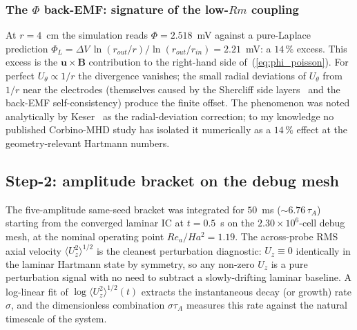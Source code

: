\documentclass[aps,prl,twocolumn,superscriptaddress]{revtex4-2}
\begin{document}
\subsubsection*{The $\Phi$ back-EMF: signature of the low-$Rm$ coupling}
At $r = 4$~cm the simulation reads $\Phi = 2.518$~mV against a
pure-Laplace prediction $\Phi_L =
\Delta V\,\ln(r_{out}/r)/\ln(r_{out}/r_{in}) = 2.21$~mV: a $14\,\%$
excess.  This excess is the $\mathbf{u}\!\times\!\mathbf{B}$
contribution to the right-hand side of~(\ref{eq:phi_poisson}).  For
perfect $U_\theta\!\propto\!1/r$ the divergence vanishes; the small
radial deviations of $U_\theta$ from $1/r$ near the electrodes
(themselves caused by the Shercliff side layers~\cite{2} and the
back-EMF self-consistency) produce the finite offset.  The
phenomenon was noted analytically by Keser~\cite{8} as the
radial-deviation correction; to my knowledge no published
Corbino-MHD study has isolated it numerically as a $14\,\%$ effect
at the geometry-relevant Hartmann numbers.

\subsection{Step-2: amplitude bracket on the debug mesh}
\label{sec:bracket}

The five-amplitude same-seed bracket was integrated for $50$~ms
($\sim\!6.76\,\tau_A$) starting from the converged laminar IC at
$t = 0.5$~s on the $2.30\!\times\!10^{6}$-cell debug mesh, at the
nominal operating point $Re_a/Ha^{2} = 1.19$.  The
across-probe RMS axial velocity $\langle U_z^{2}\rangle^{1/2}$ is the
cleanest perturbation diagnostic: $U_z\equiv 0$ identically in the
laminar Hartmann state by symmetry, so any non-zero $U_z$ is a pure
perturbation signal with no need to subtract a slowly-drifting
laminar baseline.  A log-linear fit of
$\log\langle U_z^{2}\rangle^{1/2}(t)$ extracts the instantaneous
decay (or growth) rate $\sigma$, and the dimensionless combination
$\sigma\tau_A$ measures this rate against the natural timescale of
the system.
\end{document}

